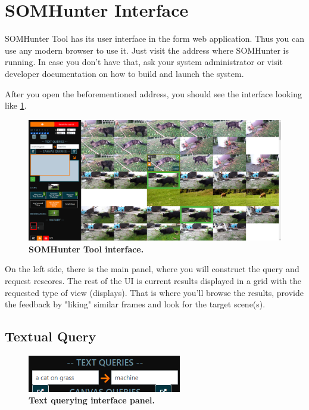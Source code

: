 \section{SOMHunter Interface}
\label{sec:interface}

SOMHunter Tool has its user interface in the form web application. Thus you can use any modern browser to use it. Just visit the address where SOMHunter is running. In case you don't have that, ask your system administrator or visit developer documentation on how to build and launch the system.

After you open the beforementioned address, you should see the interface looking like \cref{fig:ui}.

\begin{figure}[h]
	\centering
	\includegraphics[width=1.0\textwidth]{img/ui.png}
  \caption{\textbf{SOMHunter Tool interface.}}
	\label{fig:ui}
\end{figure}


On the left side, there is the main panel, where you will construct the query and request rescores. The rest of the UI is current results displayed in a grid with the requested type of view (displays).  That is where you'll browse the results, provide the feedback by "liking" similar frames and look for the target scene(s).


\subsection{Textual Query}
\begin{figure}[h]
	\centering
	\includegraphics[width=0.6\textwidth]{img/text-query.png}
  \caption{\textbf{Text querying interface panel.}}
	\label{fig:text-query}
\end{figure}

